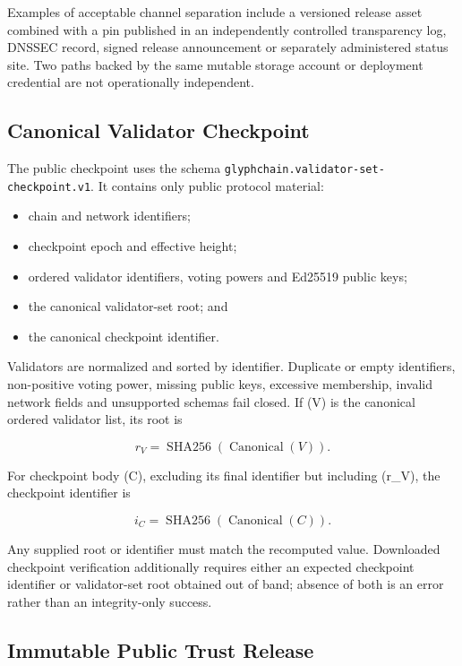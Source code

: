 Examples of acceptable channel separation include a versioned release asset
combined with a pin published in an independently controlled transparency log,
DNSSEC record, signed release announcement or separately administered status
site.  Two paths backed by the same mutable storage account or deployment
credential are not operationally independent.

\subsection{Canonical Validator Checkpoint}

The public checkpoint uses the schema
\texttt{glyphchain.validator-set-checkpoint.v1}.  It contains only public
protocol material:

\begin{itemize}[leftmargin=*]
  \item chain and network identifiers;
  \item checkpoint epoch and effective height;
  \item ordered validator identifiers, voting powers and Ed25519 public keys;
  \item the canonical validator-set root; and
  \item the canonical checkpoint identifier.
\end{itemize}

Validators are normalized and sorted by identifier.  Duplicate or empty
identifiers, non-positive voting power, missing public keys, excessive
membership, invalid network fields and unsupported schemas fail closed.  If
(V) is the canonical ordered validator list, its root is

\[
  r_V = \operatorname{SHA256}(\operatorname{Canonical}(V)).
\]

For checkpoint body (C), excluding its final identifier but including
(r_V), the checkpoint identifier is

\[
  i_C = \operatorname{SHA256}(\operatorname{Canonical}(C)).
\]

Any supplied root or identifier must match the recomputed value.  Downloaded
checkpoint verification additionally requires either an expected checkpoint
identifier or validator-set root obtained out of band; absence of both is an
error rather than an integrity-only success.

\subsection{Immutable Public Trust Release}


